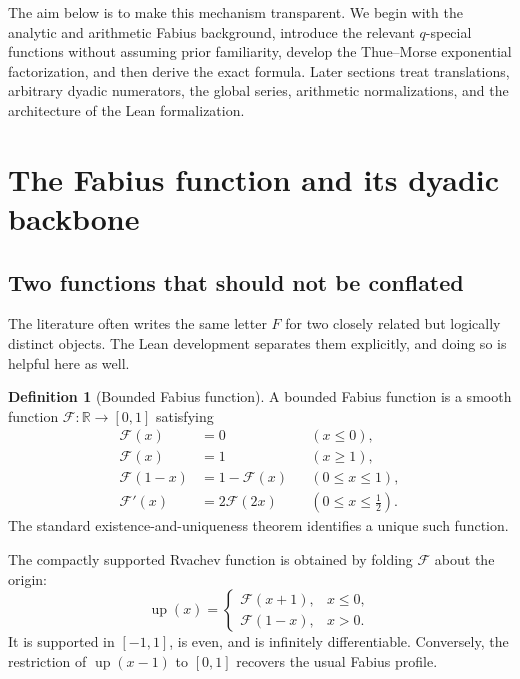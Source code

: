 \documentclass[11pt,oneside]{article}
\theoremstyle{definition}
\newtheorem{definition}[theorem]{Definition}
\theoremstyle{remark}
\newcommand{\F}{\mathcal F}
\newcommand{\upfun}{\operatorname{up}}
\newcommand{\R}{\mathbb R}
\begin{document}
The aim below is to make this mechanism transparent.  We begin with the analytic and arithmetic Fabius background, introduce the relevant $q$-special functions without assuming prior familiarity, develop the Thue--Morse exponential factorization, and then derive the exact formula.  Later sections treat translations, arbitrary dyadic numerators, the global series, arithmetic normalizations, and the architecture of the Lean formalization.

\section{The Fabius function and its dyadic backbone}

\subsection{Two functions that should not be conflated}

The literature often writes the same letter $F$ for two closely related but logically distinct objects.  The Lean development separates them explicitly, and doing so is helpful here as well.

\begin{definition}[Bounded Fabius function]
A bounded Fabius function is a smooth function $\F:\R\to[0,1]$ satisfying
\begin{align}
  \F(x)&=0 &&(x\le 0),\label{p3:eq:Fleft}\\
  \F(x)&=1 &&(x\ge 1),\label{p3:eq:Fright}\\
  \F(1-x)&=1-\F(x) &&(0\le x\le1),\label{p3:eq:Fsym}\\
  \F'(x)&=2\F(2x) &&(0\le x\le\tfrac12).\label{p3:eq:Fder}
\end{align}
The standard existence-and-uniqueness theorem identifies a unique such function.
\end{definition}

The compactly supported Rvachev function is obtained by folding $\F$ about the origin:
\begin{equation}\label{p3:eq:updef}
\upfun(x)=
\begin{cases}
 \F(x+1),&x\le0,\\
 \F(1-x),&x>0.
\end{cases}
\end{equation}
It is supported in $[-1,1]$, is even, and is infinitely differentiable.  Conversely, the restriction of $\upfun(x-1)$ to $[0,1]$ recovers the usual Fabius profile.
\end{document}
